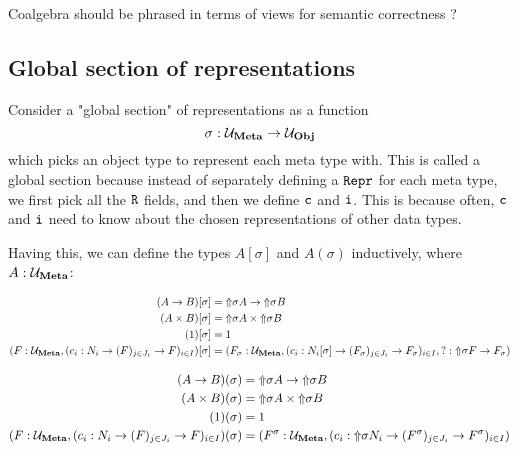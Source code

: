 Coalgebra should be phrased in terms of views for semantic correctness
\cite{Allais2023-pf,Allais2023-zq} ?

\subsection{Global section of representations}

Consider a "global section" of representations as a function
\[
  \sigma : {{\mathcal{U}_{{\textbf{Meta}}}}} \to {{\mathcal{U}_{{\textbf{Obj}}}}}
\]
which picks an object type to represent each meta type with. This is called a
global section because instead of separately defining a $\texttt{Repr}$ for each meta
type, we first pick all the $\texttt{R}$ fields, and then we define $\texttt{c}$
and $\texttt{i}$. This is because often, $\texttt{c}$ and $\texttt{i}$ need to know
about the chosen representations of other data types.

Having this, we can define the types $A[\sigma]$ and $A(\sigma)$ inductively,
where $A : {{\mathcal{U}_{{\textbf{Meta}}}}}$:

\begin{align*}
  (A \to B)[\sigma]                                                  & = \text{$\Uparrow$}{\sigma} A \to \text{$\Uparrow$}{\sigma} B                                                                                       \\
  (A \times B)[\sigma]                                               & = \text{$\Uparrow$}{\sigma} A \times \text{$\Uparrow$}{\sigma} B                                                                                    \\
  (1)[\sigma]                                                        & = 1                                                                                                                       \\
  (F : {{\mathcal{U}_{{\textbf{Meta}}}}}, (c_i : N_i \to (F)_{j \in J_i} \to F)_{i \in I})[\sigma] & = (F_\sigma : {{\mathcal{U}_{{\textbf{Meta}}}}}, (c_i : N_i[\sigma] \to (F_\sigma)_{j \in J_i} \to F_\sigma)_{i \in I}, ?: \text{$\Uparrow$}{\sigma} F \to F_\sigma)
\end{align*}

\begin{align*}
  (A \to B)(\sigma)                                                  & = \text{$\Uparrow$}{\sigma} A \to \text{$\Uparrow$}{\sigma} B                                                            \\
  (A \times B)(\sigma)                                               & = \text{$\Uparrow$}{\sigma} A \times \text{$\Uparrow$}{\sigma} B                                                         \\
  (1)(\sigma)                                                        & = 1                                                                                            \\
  (F : {{\mathcal{U}_{{\textbf{Meta}}}}}, (c_i : N_i \to (F)_{j \in J_i} \to F)_{i \in I})(\sigma) & = (F^\sigma : {{\mathcal{U}_{{\textbf{Meta}}}}}, (c_i : \text{$\Uparrow$}{\sigma} N_i \to (F^\sigma)_{j \in J_i} \to F^\sigma)_{i \in I})
\end{align*}

